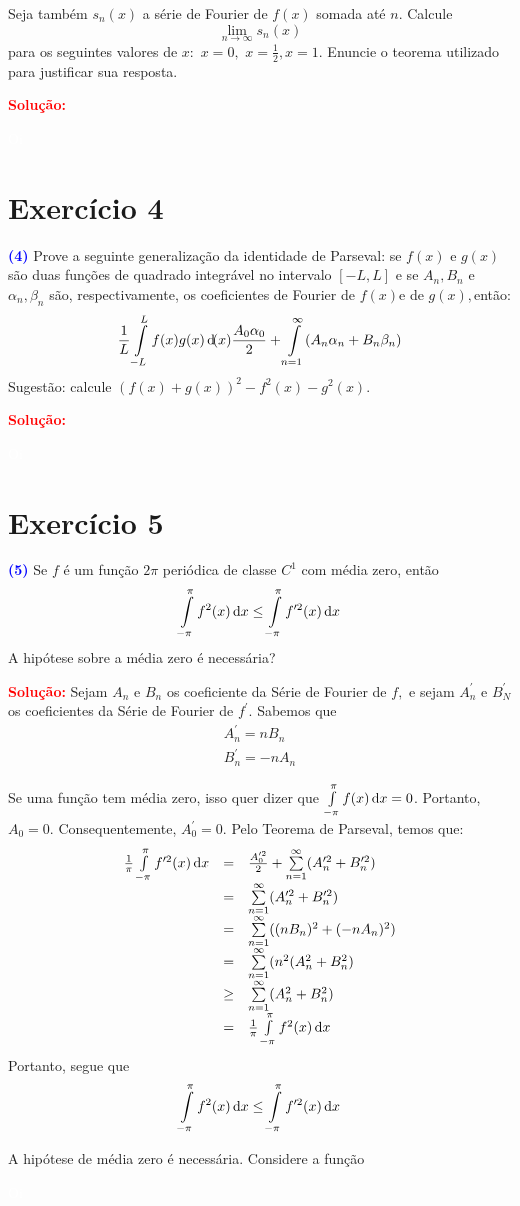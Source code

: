 \documentclass[11pt,a4paper]{article}
\newcommand{\exercicio}[1]{\section*{Exercício #1} \textcolor{blue}{\bf(#1)}}
\newcommand{\solucao}[1]{\begin{mdframed}[style=MyFrame]
\textbf{\textcolor{red}{Solução:}} #1
\end{mdframed}\textcolor{white}{Oi} \newline}
\begin{document}
Seja também $s_n(x)$ a série de Fourier de $f(x)$ somada até $n.$ Calcule
\[
\lim\limits_{n \to \infty} s_n(x)
\]
para os seguintes valores de  $x:$ $x = 0,$ $x = \frac{1}{2}, x = 1.$
Enuncie o teorema utilizado para justificar sua resposta.
\solucao{}

\exercicio{4}
Prove a seguinte generalização da identidade de Parseval: se $f(x)$ e $g(x)$ são duas funções de quadrado integrável no intervalo $[-L,L]$ e se $A_n, B_n$ e $\alpha_n, \beta_n$ são, respectivamente, os coeficientes de Fourier de $f(x)$e de $g(x),$então:
\[
\frac{1}{L} \int\limits_{-L}^L f(x) g(x) \dif (x) \frac{A_0 \alpha_0}{2} + \int\limits_{n = 1}^\infty (A_n \alpha_n + B_n \beta_n)
\]
Sugestão: calcule $(f(x) + g(x))^2 - f^2(x) - g^2(x).$
\solucao{}


\exercicio{5}
Se $f$ é um função $2 \pi$ periódica de classe $C^1$ com média zero, então
\[\int\limits_{-\pi}^{\pi} f^2(x) \dif x \le \int\limits_{-\pi}^{\pi} f^{\prime 2}(x) \dif x 
\]
A hipótese sobre a média zero é necessária?

\solucao{
Sejam $A_n$ e $B_n$ os coeficiente da Série de Fourier de $f,$ e sejam $A_n^\prime$ e $B_N^\prime$ os coeficientes da Série de Fourier de $f^\prime.$ Sabemos que
\[
\begin{array}{l}
     A_n^\prime = nB_n  \\
     B_n^\prime = -nA_n
\end{array}
\]

Se uma função tem média zero, isso quer dizer que $\int\limits_{-\pi}^{\pi} f(x) \dif x = 0$. Portanto, $A_0 = 0.$ Consequentemente, $A_0^\prime = 0.$
Pelo Teorema de Parseval, temos que:
\[
\begin{array}{lcl}
\frac{1}{\pi}\int\limits_{- \pi}^\pi f^{\prime 2}(x) \dif x &=& \frac{A_0^{\prime 2}}{2} + \sum\limits_{n = 1}^\infty (A_n^{\prime 2} + B_n^{\prime 2}) \\
& = & \sum\limits_{n = 1}^\infty (A_n^{\prime 2} + B_n^{\prime  2})\\
& = & \sum\limits_{n = 1}^\infty ((nB_n)^2 + (-nA_n)^2) \\
& = & \sum\limits_{n = 1}^\infty (n^2 (A_n^2 + B_n^2) \\
& \ge & \sum\limits_{n = 1}^\infty  (A_n^2 + B_n^2)\\
& = & \frac{1}{\pi} \int\limits_{-\pi}^{\pi} f^2(x) \dif x
\end{array}
\]
Portanto, segue que 
\[\int\limits_{-\pi}^{\pi} f^2(x) \dif x \le \int\limits_{-\pi}^{\pi} f^{\prime 2}(x) \dif x 
\]

A hipótese de média zero é necessária. Considere a função
}
\end{document}
